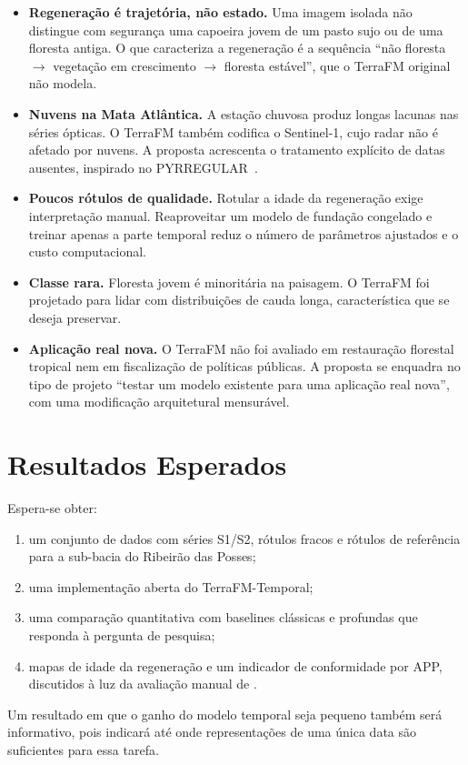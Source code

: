 \documentclass[conference]{IEEEtran}
\begin{document}
\begin{itemize}
\item \textbf{Regeneração é trajetória, não estado.} Uma imagem isolada não distingue com segurança uma capoeira jovem de um pasto sujo ou de uma floresta antiga. O que caracteriza a regeneração é a sequência ``não floresta $\rightarrow$ vegetação em crescimento $\rightarrow$ floresta estável'', que o TerraFM original não modela.
\item \textbf{Nuvens na Mata Atlântica.} A estação chuvosa produz longas lacunas nas séries ópticas. O TerraFM também codifica o Sentinel-1, cujo radar não é afetado por nuvens. A proposta acrescenta o tratamento explícito de datas ausentes, inspirado no PYRREGULAR~\citep{spinnato2026pyrregular}.
\item \textbf{Poucos rótulos de qualidade.} Rotular a idade da regeneração exige interpretação manual. Reaproveitar um modelo de fundação congelado e treinar apenas a parte temporal reduz o número de parâmetros ajustados e o custo computacional.
\item \textbf{Classe rara.} Floresta jovem é minoritária na paisagem. O TerraFM foi projetado para lidar com distribuições de cauda longa, característica que se deseja preservar.
\item \textbf{Aplicação real nova.} O TerraFM não foi avaliado em restauração florestal tropical nem em fiscalização de políticas públicas. A proposta se enquadra no tipo de projeto ``testar um modelo existente para uma aplicação real nova'', com uma modificação arquitetural mensurável.
\end{itemize}

\section{Resultados Esperados}\label{sec:esperados}

Espera-se obter:
\begin{enumerate}
\item um conjunto de dados com séries S1/S2, rótulos fracos e rótulos de referência para a sub-bacia do Ribeirão das Posses;
\item uma implementação aberta do TerraFM-Temporal;
\item uma comparação quantitativa com baselines clássicas e profundas que responda à pergunta de pesquisa;
\item mapas de idade da regeneração e um indicador de conformidade por APP, discutidos à luz da avaliação manual de \citet{ruggiero2019}.
\end{enumerate}
Um resultado em que o ganho do modelo temporal seja pequeno também será informativo, pois indicará até onde representações de uma única data são suficientes para essa tarefa.
\end{document}
